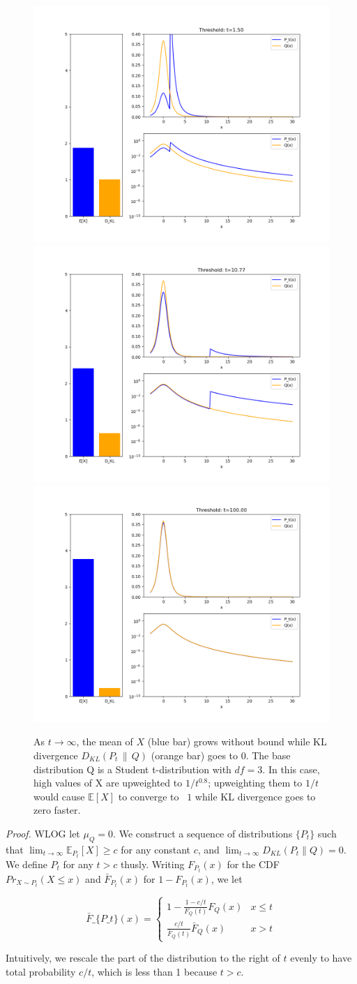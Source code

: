 \documentclass{article}
\begin{document}
\begin{figure}
    \label{fig_thm1}
    \centering
    \includegraphics[width=0.3\linewidth]{goodhart_kl_001.png}
    \includegraphics[width=0.3\linewidth]{goodhart_kl_024.png}
    \includegraphics[width=0.3\linewidth]{goodhart_kl_050.png}
    \caption{As $t \to \infty$, the mean of $X$ (blue bar) grows without bound while KL divergence $D_{KL}(P_t \,\|\, Q)$ (orange bar) goes to 0. The base distribution Q is a Student t-distribution with $df=3$. In this case, high values of X are upweighted to $1/t^{0.8}$; upweighting them to $1/t$ would cause $\mathbb E[X]$ to converge to ~$1$ while KL divergence goes to zero faster.}
\end{figure}

\emph{Proof.} WLOG let \(\mu_Q = 0\). We construct a sequence of
distributions \(\{P_t\}\) such that
\(\lim_{t \to \infty} \mathbb E_{P_t}[X] \ge c\) for any constant \(c\),
and \(\lim_{t \to \infty} D_{KL}(P_t \| Q) = 0\). We define \(P_t\) for
any \(t > c\) thusly. Writing \(F_{P_t}(x)\) for the CDF
\(Pr_{X \sim P_t}(X \le x)\) and \(\bar F_{P_t}(x)\) for
\(1 - F_{P_t}(x)\), we let

$$ \bar F\_\{P\_t\}(x) =
\begin{cases} 1 - \frac{1 - c/t}{F_Q(t)}F_Q(x) & x \le t
\\ \frac{c/t}{\bar F_Q(t)}\bar F_Q(x) & x > t
\end{cases}
$$

Intuitively, we rescale the part of the distribution to the right of
\(t\) evenly to have total probability \(c/t\), which is less than 1
because \(t > c\).
\end{document}
